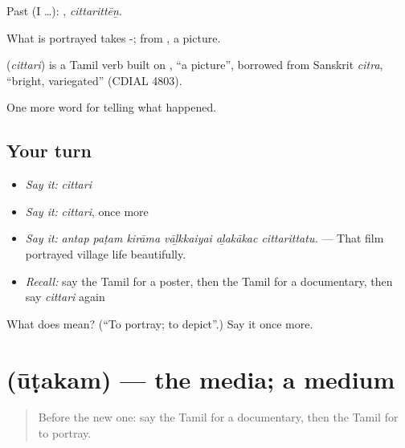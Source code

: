 Past (I …): , \emph{cittarittēṉ}.

What is portrayed takes -; from , a picture.

\begin{cousinweb}
\textbf{} (\emph{cittari}) is a Tamil verb built on , \textquotedblleft{}a picture\textquotedblright{}, borrowed from Sanskrit \emph{citra}, \textquotedblleft{}bright, variegated\textquotedblright{} (CDIAL 4803).
\end{cousinweb}

\begin{grammarlens}[title={What you've built}]
One more word for telling what happened.
\end{grammarlens}

\subsection*{Your turn}
\begin{itemize}
\raggedright
  \item \emph{Say it:} \emph{cittari}
  \item \emph{Say it:} \emph{cittari}, once more
  \item \emph{Say it:} \emph{antap paṭam kirāma vāḻkkaiyai aḻakākac cittarittatu.} — That film portrayed village life beautifully.
  \item \emph{Recall:} say the Tamil for a poster, then the Tamil for a documentary, then say \emph{cittari} again
\end{itemize}

\begin{tcolorbox}[breakable,colback=teal!4,colframe=teal!35!black,title={Before you move on}]
What does  mean? (\textquotedblleft{}To portray; to depict\textquotedblright{}.) Say it once more.
\end{tcolorbox}
\section[\texorpdfstring{\ta{ஊடகம்} (ūṭakam)}{ஊடகம் (ūṭakam)}]{ (ūṭakam) — the media; a medium}

\label{lesson:TA-C310-utakam}



\begin{quote}
Before the new one: say the Tamil for a documentary, then the Tamil for to portray.
\end{quote}

